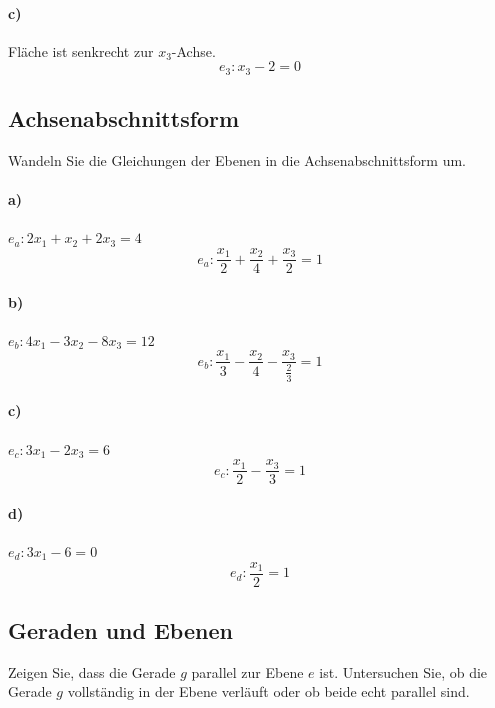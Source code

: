 \documentclass{ajc}
\numberwithin{equation}{subsection}
\begin{document}
	\paragraph{c)} Fläche ist senkrecht zur $x_3$-Achse.
	\begin{equation}
		e_3: x_3 - 2 = 0
	\end{equation}
	
	\subsection{Achsenabschnittsform}
	Wandeln Sie die Gleichungen der Ebenen in die Achsenabschnittsform um.
	
	\paragraph{a)} $e_a: 2x_1 + x_2 + 2x_3 = 4$
	\begin{equation}
		e_a: \frac{x_1}{2} + \frac{x_2}{4} + \frac{x_3}{2} = 1
	\end{equation}
	
	\paragraph{b)} $e_b: 4x_1 - 3x_2 - 8x_3 = 12$
	\begin{equation}
		e_b: \frac{x_1}{3} - \frac{x_2}{4} - \frac{x_3}{\frac{2}{3}} = 1
	\end{equation}
	
	\paragraph{c)} $e_c: 3x_1 - 2x_3 = 6$
	\begin{equation}
		e_c: \frac{x_1}{2} - \frac{x_3}{3} = 1
	\end{equation}
	
	\paragraph{d)} $e_d: 3x_1 - 6 = 0$
	\begin{equation}
		e_d: \frac{x_1}{2} = 1
	\end{equation}
	
	\subsection{Geraden und Ebenen}
	Zeigen Sie, dass die Gerade $g$ parallel zur Ebene $e$ ist. Untersuchen Sie, ob die Gerade $g$ vollständig in der Ebene verläuft oder ob beide echt parallel sind.
	
\end{document}
